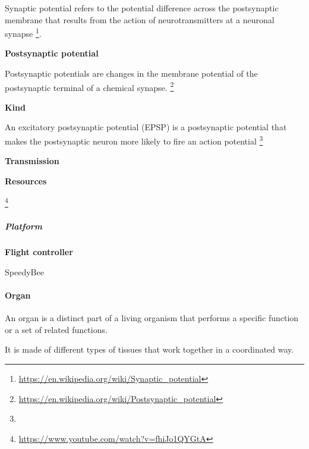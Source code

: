 \documentclass{book}
\providecommand{\ProjectDeepHeading}[2]{%
    \par\medskip\noindent\textbf{#2}\par\smallskip
}
\providecommand{\seeherefooter}[1]{\footnote{\url{#1}}}
\begin{document}

Synaptic potential refers to the potential difference across the postsynaptic membrane that results from the action of neurotransmitters at a neuronal synapse \seeherefooter{https://en.wikipedia.org/wiki/Synaptic_potential}.

\ProjectDeepHeading{5}{Postsynaptic potential}


Postsynaptic potentials are changes in the membrane potential of the postsynaptic terminal of a chemical synapse.
    \seeherefooter{https://en.wikipedia.org/wiki/Postsynaptic_potential}

\ProjectDeepHeading{6}{Kind}


An excitatory postsynaptic potential (EPSP) is a postsynaptic potential that makes the postsynaptic neuron more likely to fire an action potential \footnote{}

\ProjectDeepHeading{4}{Transmission}


\ProjectDeepHeading{7}{Resources}
        \seeherefooter{https://www.youtube.com/watch?v=fhiJo1QYGtA}

\subparagraph{Platform}

\ProjectDeepHeading{1}{Flight controller}


SpeedyBee

\paragraph{Organ}


An organ is a distinct part of a living organism that performs a specific function or a set of related functions.


    It is made of different types of tissues that work together in a coordinated way.
    
\end{document}
